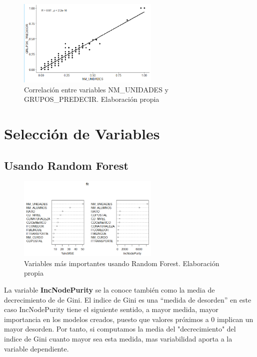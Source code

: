 \begin{subappendices}
\begin{figure}[htb]
\end{figure}
\FloatBarrier

\begin{figure}[htb]
	\centering
	\caption{Correlación entre variables NM\_UNIDADES y GRUPOS\_PREDECIR. Elaboración propia}
	\label{fig:RelacionGruposYUnidades}
	\includegraphics[width=0.6\textwidth]{recursos/ImagenesR/RelacionGruposYUnidades}
	
\end{figure}
\FloatBarrier

\section{Selección de Variables}
\subsection{Usando Random Forest}
\begin{figure}[htb]
	\centering
	\caption{Variables más importantes usando Random Forest. Elaboración propia}
	\label{fig:VarImpRF}
	\includegraphics[width=0.6\textwidth]{recursos/ImagenesR/VarImpRF}
	
\end{figure}
\FloatBarrier
La variable \textbf{IncNodePurity} se la conoce también como la media de decrecimiento de de Gini. El indice de Gini es una ``medida de desorden'' en este caso IncNodePurity tiene el siguiente sentido, a mayor medida, mayor importancia en los modelos creados, puesto que valores próximos a 0 implican un mayor desorden. Por tanto, si computamos la media del "decrecimiento" del indice de Gini cuanto mayor sea esta medida, mas variabilidad aporta a la variable dependiente.


\end{subappendices}
